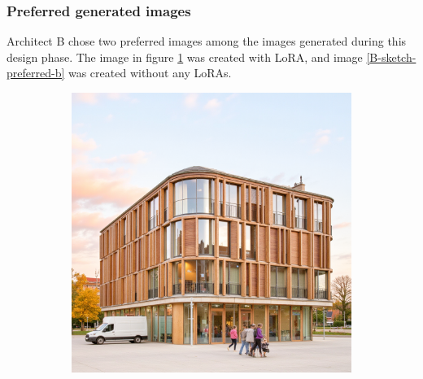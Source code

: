 \subsubsection{Preferred generated images}
Architect B chose two preferred images among the images generated during this design phase. The image in figure \ref{B-sketch-preferred-a} was created with LoRA, and image \ref{B-sketch-preferred-b} was created without any LoRAs.
\begin{figure}[H]
    \centering
    \begin{subfigure}[b]{0.3\textwidth}
        \centering
        \includegraphics[width=\textwidth]{Images/Results/Architect B/1. Sketch phase/Met_lora_00002_.png}
        \caption{}
        \label{B-sketch-preferred-a}
    \end{subfigure}
    \begin{subfigure}[b]{0.3\textwidth}
        \centering

\end{subfigure}
\end{figure}
